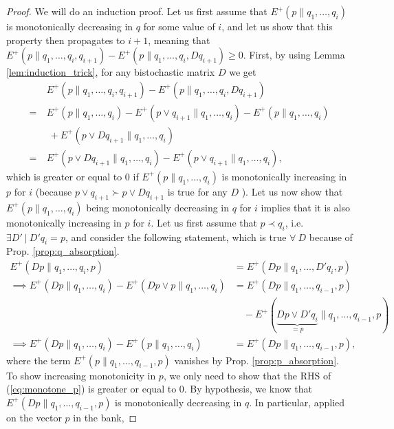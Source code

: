 \begin{proof}
    We will do an induction proof. Let us first assume that $E^+(p \parallel q_1, \dots, q_i)$ is monotonically decreasing in $q$ for some value of $i$, and let us show that this property then propagates to $i+1$, meaning that $E^+(p \parallel q_1, \dots, q_i, q_{i+1}) - E^+(p \parallel q_1, \dots, q_i, Dq_{i+1}) \geq 0$. First, by using Lemma \ref{lem:induction_trick}, for any bistochastic matrix $D$ we get
    \begin{align}
        &E^+(p \parallel q_1, \dots, q_i, q_{i+1}) - E^+(p \parallel q_1, \dots, q_i, Dq_{i+1})\nonumber \\
        = \: &E^+(p \parallel q_1, \dots, q_i) - E^+(p \vee q_{i+1} \parallel q_1, \dots, q_i) - E^+(p \parallel q_1, \dots, q_i)\nonumber\\
        &\: +  E^+(p \vee Dq_{i+1} \parallel q_1, \dots, q_i)\\
        = \: &E^+(p \vee Dq_{i+1} \parallel q_1, \dots, q_i) - E^+(p \vee q_{i+1} \parallel q_1, \dots, q_i),
    \end{align}
    which is greater or equal to 0 if $E^+(p \parallel q_1, \dots, q_i)$ is monotonically increasing in $p$ for $i$ (because $p \vee q_{i+1} \succ p \vee Dq_{i+1}$ is true for any $D$ \cite[p. 35]{davey_introduction_2002}). Let us now show that $E^+(p \parallel q_1, \dots, q_i)$ being monotonically decreasing in $q$ for $i$ implies that it is also monotonically increasing in $p$ for $i$. Let us first assume that $p \prec q_i$, i.e. $\exists D' \: | \: D' q_i = p$, and consider the following statement, which is true $\forall \: D$ because of Prop. \ref{prop:q_absorption}.
    \begin{align}
        E^+(Dp \parallel q_1, \dots, q_i, p) &= E^+(Dp \parallel q_1, \dots, D'q_i, p) \\
        \implies E^+(Dp \parallel q_1, \dots, q_i) - E^+(Dp \vee p \parallel q_1, \dots, q_i) &= E^+(Dp \parallel q_1, \dots, q_{i-1}, p)\nonumber\\
        &\quad - E^+(\underbrace{Dp \vee D'q_i}_{=p} \parallel q_1, \dots, q_{i-1}, p)\\
        \implies E^+(Dp \parallel q_1, \dots, q_i) - E^+(p \parallel q_1, \dots, q_i) &= E^+(Dp \parallel q_1, \dots, q_{i-1}, p), \label{eq:monotone_p}
    \end{align}
    where the term $E^+(p \parallel q_1, \dots, q_{i-1}, p)$ vanishes by Prop. \ref{prop:p_absorption}. To show increasing monotonicity in $p$, we only need to show that the RHS of (\ref{eq:monotone_p}) is greater or equal to 0. By hypothesis, we know that $E^+(Dp \parallel q_1, \dots, q_{i-1}, p)$ is monotonically decreasing in $q$. In particular, applied on the vector $p$ in the bank,

\end{proof}
